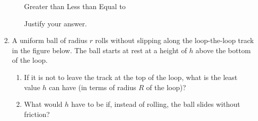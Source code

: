 \documentclass{../../../oss-apphys}
\begin{document}
\begin{enumerate}[leftmargin=15pt]
\begin{enumerate}[leftmargin=15pt,resume]
    \vspace{.1in}
    \underline{\hspace{.3in}} Greater than\hspace{.2in}
    \underline{\hspace{.3in}} Less than\hspace{.2in}
    \underline{\hspace{.3in}} Equal to
    
    \vspace{.1in}Justify your answer.
  \end{enumerate}
  \newpage
  
\item A uniform ball of radius $r$ rolls without slipping along the
  loop-the-loop track in the figure below. The ball starts at rest at a height
  of $h$ above the bottom of the loop.
  \begin{center}
  \end{center}
  \begin{enumerate}[itemsep=1.7in,topsep=0pt,leftmargin=15pt]
  \item\vspace{-.3in}If it is not to leave the track at the top of the loop,
    what is the least value $h$ can have (in terms of radius $R$ of the loop)?
  \item What would $h$ have to be if, instead of rolling, the ball slides
    without friction?
  \end{enumerate}
  

\end{enumerate}
\end{document}
